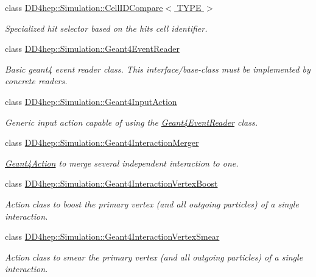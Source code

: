 \begin{DoxyCompactItemize}
class \hyperlink{class_d_d4hep_1_1_simulation_1_1_cell_i_d_compare}{D\+D4hep\+::\+Simulation\+::\+Cell\+I\+D\+Compare$<$ T\+Y\+P\+E $>$}
\begin{DoxyCompactList}\small\item\em Specialized hit selector based on the hit\textquotesingle{}s cell identifier. \end{DoxyCompactList}\item 
class \hyperlink{class_d_d4hep_1_1_simulation_1_1_geant4_event_reader}{D\+D4hep\+::\+Simulation\+::\+Geant4\+Event\+Reader}
\begin{DoxyCompactList}\small\item\em Basic geant4 event reader class. This interface/base-\/class must be implemented by concrete readers. \end{DoxyCompactList}\item 
class \hyperlink{class_d_d4hep_1_1_simulation_1_1_geant4_input_action}{D\+D4hep\+::\+Simulation\+::\+Geant4\+Input\+Action}
\begin{DoxyCompactList}\small\item\em Generic input action capable of using the \hyperlink{class_d_d4hep_1_1_simulation_1_1_geant4_event_reader}{Geant4\+Event\+Reader} class. \end{DoxyCompactList}\item 
class \hyperlink{class_d_d4hep_1_1_simulation_1_1_geant4_interaction_merger}{D\+D4hep\+::\+Simulation\+::\+Geant4\+Interaction\+Merger}
\begin{DoxyCompactList}\small\item\em \hyperlink{class_d_d4hep_1_1_simulation_1_1_geant4_action}{Geant4\+Action} to merge several independent interaction to one. \end{DoxyCompactList}\item 
class \hyperlink{class_d_d4hep_1_1_simulation_1_1_geant4_interaction_vertex_boost}{D\+D4hep\+::\+Simulation\+::\+Geant4\+Interaction\+Vertex\+Boost}
\begin{DoxyCompactList}\small\item\em Action class to boost the primary vertex (and all outgoing particles) of a single interaction. \end{DoxyCompactList}\item 
class \hyperlink{class_d_d4hep_1_1_simulation_1_1_geant4_interaction_vertex_smear}{D\+D4hep\+::\+Simulation\+::\+Geant4\+Interaction\+Vertex\+Smear}
\begin{DoxyCompactList}\small\item\em Action class to smear the primary vertex (and all outgoing particles) of a single interaction. \end{DoxyCompactList}\item 

\end{DoxyCompactItemize}
